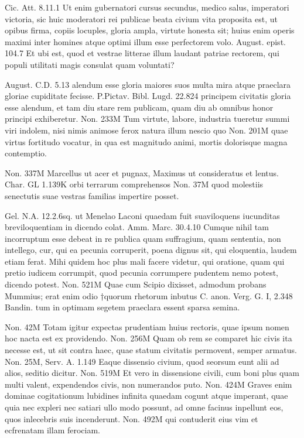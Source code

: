  Cic. Att. 8.11.1 Ut enim gubernatori cursus secundus, medico salus, imperatori victoria, sic huic moderatori rei publicae beata civium vita proposita est, ut opibus firma, copiis locuples, gloria ampla, virtute honesta sit; huius enim operis maximi inter homines atque optimi illum esse perfectorem volo. August. epist. 104.7 Et ubi est, quod et vestrae litterae illum laudant patriae rectorem, qui populi utilitati magis consulat quam voluntati?

 August. C.D. 5.13 alendum esse gloria maiores suos multa mira atque praeclara gloriae cupiditate fecisse. P.Pictav. Bibl. Lugd. 22.824 principem civitatis gloria esse alendum, et tam diu stare rem publicam, quam diu ab omnibus honor principi exhiberetur. Non. 233M Tum virtute, labore, industria tueretur summi viri indolem, nisi nimis animose ferox natura illum nescio quo Non. 201M quae virtus fortitudo vocatur, in qua est magnitudo animi, mortis dolorisque magna contemptio.

 Non. 337M Marcellus ut acer et pugnax, Maximus ut consideratus et lentus. Char. GL 1.139K orbi terrarum comprehensos Non. 37M quod molestiis senectutis suae vestras familias impertire posset.

 Gel. N.A. 12.2.6sq. ut Menelao Laconi quaedam fuit suaviloquens iucunditas breviloquentiam in dicendo colat. Amm. Marc. 30.4.10 Cumque nihil tam incorruptum esse debeat in re publica quam suffragium, quam sententia, non intellego, cur, qui ea pecunia corruperit, poena dignus sit, qui eloquentia, laudem etiam ferat. Mihi quidem hoc plus mali facere videtur, qui oratione, quam qui pretio iudicem corrumpit, quod pecunia corrumpere pudentem nemo potest, dicendo potest. Non. 521M Quae cum Scipio dixisset, admodum probans Mummius; erat enim odio †quorum rhetorum inbutus C. anon. Verg. G. I, 2.348 Bandin. tum in optimam segetem praeclara essent sparsa semina.

 Non. 42M Totam igitur expectas prudentiam huius rectoris, quae ipsum nomen hoc nacta est ex providendo. Non. 256M Quam ob rem se comparet hic civis ita necesse est, ut sit contra haec, quae statum civitatis permovent, semper armatus. Non. 25M, Serv. A. 1.149 Eaque dissensio civium, quod seorsum eunt alii ad alios, seditio dicitur. Non. 519M Et vero in dissensione civili, cum boni plus quam multi valent, expendendos civis, non numerandos puto. Non. 424M Graves enim dominae cogitationum lubidines infinita quaedam cogunt atque imperant, quae quia nec expleri nec satiari ullo modo possunt, ad omne facinus inpellunt eos, quos inlecebris suis incenderunt. Non. 492M qui contuderit eius vim et ecfrenatam illam ferociam.

